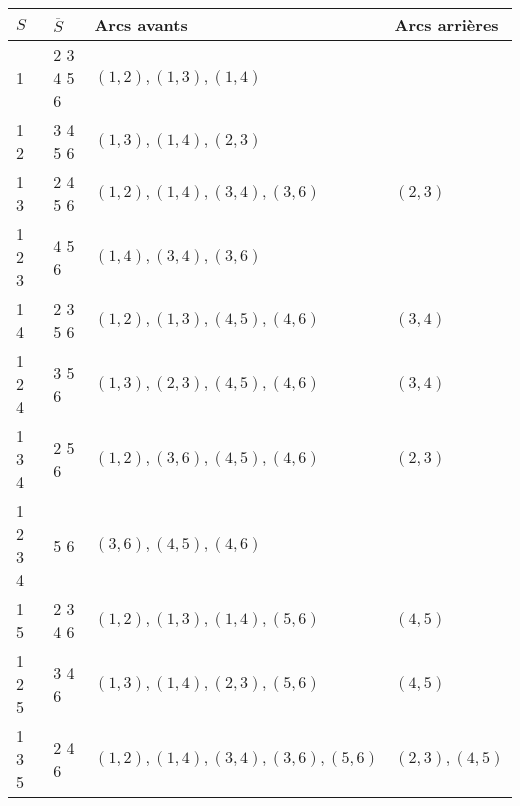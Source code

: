 \documentclass{article}
\begin{document}

\begin{tabular}{|l|l|l|l|}
  \hline
  $S$ & $\overline{S}$ & Arcs avants & Arcs arrières \\
  \hline
  \hline
  1 \phantom{2} \phantom{3} \phantom{4} \phantom{5} &          2           3           4           5  6 & ${(1,2), (1,3), (1,4)}$               & ${}$             \\
  1          2  \phantom{3} \phantom{4} \phantom{5} & \phantom{2}          3           4           5  6 & ${(1,3), (1,4), (2,3)}$               & ${}$             \\
  1 \phantom{2}          3  \phantom{4} \phantom{5} &          2  \phantom{3}          4           5  6 & ${(1,2), (1,4), (3,4), (3,6)}$        & ${(2,3)}$        \\
  1          2           3  \phantom{4} \phantom{5} & \phantom{2} \phantom{3}          4           5  6 & ${(1,4), (3,4), (3,6)}$               & ${}$             \\
  1 \phantom{2} \phantom{3}          4  \phantom{5} &          2           3  \phantom{4}          5  6 & ${(1,2), (1,3), (4,5), (4,6)}$        & ${(3,4)}$        \\
  1          2  \phantom{3}          4  \phantom{5} & \phantom{2}          3  \phantom{4}          5  6 & ${(1,3), (2,3), (4,5), (4,6)}$        & ${(3,4)}$        \\
  1 \phantom{2}          3           4  \phantom{5} &          2  \phantom{3} \phantom{4}          5  6 & ${(1,2), (3,6), (4,5), (4,6)}$        & ${(2,3)}$        \\
  1          2           3           4  \phantom{5} & \phantom{2} \phantom{3} \phantom{4}          5  6 & ${(3,6), (4,5), (4,6)}$               & ${}$             \\
  1 \phantom{2} \phantom{3} \phantom{4}          5  &          2           3           4  \phantom{5} 6 & ${(1,2), (1,3), (1,4), (5,6)}$        & ${(4,5)}$        \\
  1          2  \phantom{3} \phantom{4}          5  & \phantom{2}          3           4  \phantom{5} 6 & ${(1,3), (1,4), (2,3), (5,6)}$        & ${(4,5)}$        \\
  1 \phantom{2}          3  \phantom{4}          5  &          2  \phantom{3}          4  \phantom{5} 6 & ${(1,2), (1,4), (3,4), (3,6), (5,6)}$ & ${(2,3), (4,5)}$ \\

\end{tabular}
\end{document}
